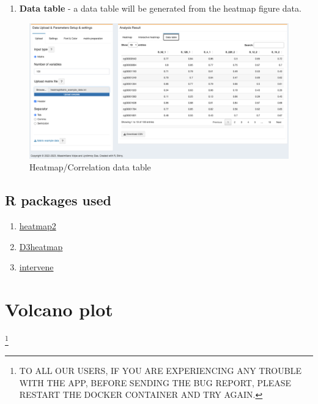 \documentclass[
  a4paper,
  oneside,
  open=any]{scrreport}
\providecommand{\tightlist}{%
  \setlength{\itemsep}{0pt}\setlength{\parskip}{0pt}}\usepackage{longtable,booktabs,array}
\begin{document}
\begin{enumerate}
\def\labelenumi{\arabic{enumi}.}
\setcounter{enumi}{2}
\tightlist
\item
  \textbf{Data table} - a data table will be generated from the heatmap
  figure data.
\end{enumerate}

\begin{figure}[H]

{\centering \includegraphics{./_images/heatmap-datatable.png}

}

\caption{Heatmap/Correlation data table}

\end{figure}

\hypertarget{r-packages-used-2}{%
\section{R packages used}\label{r-packages-used-2}}

\begin{enumerate}
\def\labelenumi{\arabic{enumi}.}
\tightlist
\item
  \href{https://biocorecrg.github.io/CRG_RIntroduction/heatmap-2-function-from-gplots-package.html}{heatmap2}
\item
  \href{https://github.com/talgalili/d3heatmap}{D3heatmap}
\item
  \href{https://github.com/asntech/intervene}{intervene}
\end{enumerate}

\hypertarget{sec-volcano}{%
\chapter{Volcano plot}\label{sec-volcano}}

\footnote{TO ALL OUR USERS, IF YOU ARE EXPERIENCING ANY TROUBLE WITH THE
  APP, BEFORE SENDING THE BUG REPORT, PLEASE RESTART THE DOCKER
  CONTAINER AND TRY AGAIN.}
\end{document}
